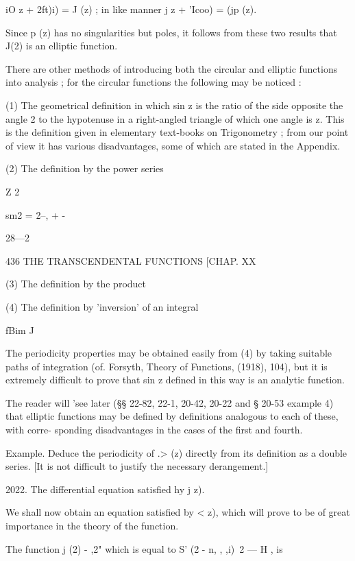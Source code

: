 {iO  z + 2ft)i) =  J (z) ; 
in like manner  j  z + 'Icoo) = (jp (z). 

Since p (z) has no singularities but poles, it follows from these two results 
that  J(2) is an elliptic function. 

There are other methods of introducing both the circular and elliptic functions into 
analysis ; for the circular functions the following may be noticed : 

(1) The geometrical definition in which sin z is the ratio of the side opposite the angle 
2 to the hypotenuse in a right-angled triangle of which one angle is z. This is the definition 
given in elementary text-books on Trigonometry ; from our point of view it has various 
disadvantages, some of which are stated in the Appendix. 

(2) The definition by the power series 



Z  2 

sm2 = 2--, + - 



28—2 



436 THE TRANSCENDENTAL FUNCTIONS [CHAP. XX 

(3) The definition by the product 

(4) The definition by 'inversion' of an integral 

fBim 
J 

The periodicity properties may be obtained easily from (4) by taking suitable paths of 
integration (of. Forsyth, Theory of Functions, (1918),   104), but it is extremely difficult to 
prove that sin z defined in this way is an analytic function. 

The reader will 'see later (§§ 22-82, 22-1, 20-42, 20-22 and § 20-53 example 4) that 
elliptic functions may be defined by definitions analogous to each of these, with corre- 
sponding disadvantages in the cases of the first and fourth. 

Example. Deduce the periodicity of  .> (z) directly from its definition as a double series. 
[It is not difficult to justify the necessary derangement.] 

2022. The differential equation satisfied hy  j  z). 

We shall now obtain an equation satisfied by <   z), which will prove to 
be of great importance in the theory of the function. 

The function  j (2) - ,2"  which is equal to S'  (2 - n, , ,i)~2 — H  , is 

}
